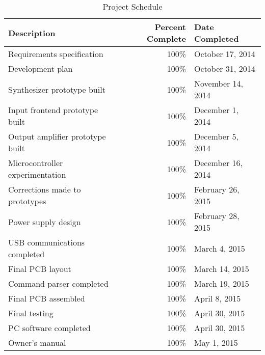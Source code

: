 \begin{table}[H]
\centering
\begin{tabular}{|p{2.5in}|r|l|}
\hline
\textbf{Description} & \textbf{Percent Complete} & \textbf{Date Completed} \\ \hline \hline
Requirements specification          & 100\% & October 17, 2014 \\ \hline
Development plan                    & 100\% & October 31, 2014 \\ \hline
Synthesizer prototype built         & 100\% & November 14, 2014 \\ \hline
Input frontend prototype built      & 100\% & December 1, 2014 \\ \hline
Output amplifier prototype built    & 100\% & December 5, 2014 \\ \hline
Microcontroller experimentation     & 100\% & December 16, 2014 \\ \hline
Corrections made to prototypes      & 100\% & February 26, 2015 \\ \hline
Power supply design                 & 100\% & February 28, 2015 \\ \hline
USB communications completed        & 100\% & March 4, 2015 \\ \hline
Final PCB layout                    & 100\% & March 14, 2015 \\ \hline
Command parser completed            & 100\% & March 19, 2015 \\ \hline
Final PCB assembled                 & 100\% & April 8, 2015 \\ \hline
Final testing                       & 100\% & April 30, 2015 \\ \hline
PC software completed               & 100\% & April 30, 2015 \\ \hline
Owner's manual                      & 100\% & May 1, 2015 \\ \hline
\end{tabular}
\caption{Project Schedule}
\label{tab:schedule}
\end{table}
